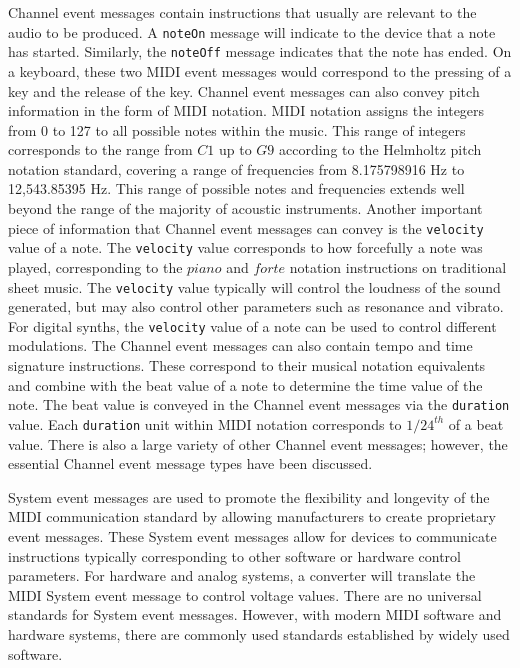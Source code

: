 \documentclass[a4paper,12pt]{report}
\begin{document}
Channel event messages contain instructions that usually are relevant to the audio to be produced. A \texttt{note\-On} message will indicate to the device that a note has started. Similarly, the \texttt{note\-Off} message indicates that the note has ended. On a keyboard, these two MIDI event messages would correspond to the pressing of a key and the release of the key. Channel event messages can also convey pitch information in the form of MIDI notation. MIDI notation assigns the integers from 0 to 127 to all possible notes within the music. This range of integers corresponds to the range from $C1$ up to $G9$ according to the Helmholtz pitch notation standard, covering a range of frequencies from 8.175798916 Hz to 12,543.85395 Hz. This range of possible notes and frequencies extends well beyond the range of the majority of acoustic instruments. Another important piece of information that Channel event messages can convey is the \texttt{velocity} value of a note. The \texttt{velocity} value corresponds to how forcefully a note was played, corresponding to the $piano$ and $forte$ notation instructions on traditional sheet music. The \texttt{velocity} value typically will control the loudness of the sound generated, but may also control other parameters such as resonance and vibrato. For digital synths, the \texttt{velocity} value of a note can be used to control different modulations. The Channel event messages can also contain tempo and time signature instructions. These correspond to their musical notation equivalents and combine with the beat value of a note to determine the time value of the note. The beat value is conveyed in the Channel event messages via the \texttt{duration} value. Each \texttt{duration} unit within MIDI notation corresponds to $1/24^{th}$ of a beat value. There is also a large variety of other Channel event messages; however, the essential Channel event message types have been discussed.

System event messages are used to promote the flexibility and longevity of the MIDI communication standard by allowing manufacturers to create proprietary event messages. These System event messages allow for devices to communicate instructions typically corresponding to other software or hardware control parameters. For hardware and analog systems, a converter will translate the MIDI System event message to control voltage values. There are no universal standards for System event messages. However, with modern MIDI software and hardware systems, there are commonly used standards established by widely used software.
\end{document}
